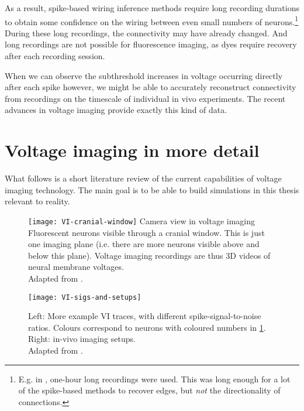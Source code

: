 As a result, spike-based wiring inference methods require long recording durations to obtain some confidence on the wiring between even small numbers of neurons.\footnote{
    E.g. in \cite{Orlandi2017FirstConnectomicsChallenge}, one-hour long recordings were used. This was long enough for a lot of the spike-based methods to recover edges, but \emph{not} the directionality of connections.
}
During these long recordings, the connectivity may have already changed. And long recordings are not possible for fluorescence imaging, as dyes require recovery after each recording session.

When we can observe the subthreshold increases in voltage occurring directly after each spike however, we might be able to accurately reconstruct connectivity from recordings on the timescale of individual in vivo experiments. The recent advances in voltage imaging provide exactly this kind of data.



\clearpage
\section{Voltage imaging in more detail}
\label{sec:voltage-imaging}

What follows is a short literature review of the current capabilities of voltage imaging technology. The main goal is to be able to build simulations in this thesis relevant to reality.

\FloatBarrier

\begin{figure}
    \texttt{[image: VI-cranial-window]}
    \captionn
        {Camera view in voltage imaging}
        {Fluorescent neurons visible through a cranial window. This is just one imaging plane (i.e. there are more neurons visible above and below this plane). Voltage imaging recordings are thus 3D videos of neural membrane voltages.\\
        Adapted from \cite{Abdelfattah2019BrightPhotostableChemigenetic,Knopfel2019OpticalVoltageImaging}.}
    \label{fig:VI-cranial-window}
\end{figure}

\begin{figure}
    \texttt{[image: VI-sigs-and-setups]}
    \caption
        {Left: More example VI traces, with different spike-signal-to-noise ratios. Colours correspond to neurons with coloured numbers in \cref{fig:VI-cranial-window}. Right: in-vivo imaging setups.\\
        Adapted from \cite{Abdelfattah2019BrightPhotostableChemigenetic,Knopfel2019OpticalVoltageImaging}.}
    \label{fig:VI-sigs-and-setups}
\end{figure}



